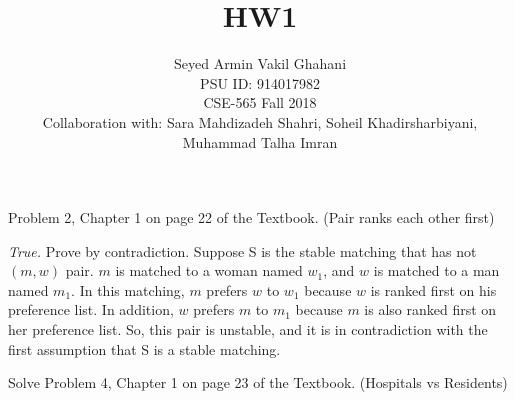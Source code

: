 \documentclass[12pt]{article}
\newenvironment{solution}[2][Solution]{\begin{trivlist}
\item[\hskip \labelsep {\bfseries #1}]}{\end{trivlist}}
\newenvironment{problem}[2][Problem]{\begin{trivlist}
\item[\hskip \labelsep {\bfseries #1}\hskip \labelsep {\bfseries #2.}]}{\end{trivlist}}
\begin{document}
 
\title{HW1}%
\author{Seyed Armin Vakil Ghahani\\ %
PSU ID: 914017982\\
CSE-565 Fall 2018\\
Collaboration with:
Sara Mahdizadeh Shahri, Soheil Khadirsharbiyani,\\
Muhammad Talha Imran} %
 
\maketitle
\begin{problem}{1}
Problem 2, Chapter 1 on page 22 of the Textbook. (Pair ranks each other first)
\end{problem}

\begin{solution}{}
\textit{True.} Prove by contradiction.
Suppose S is the stable matching that has not $(m,w)$ pair.
$m$ is matched to a woman named $w_1$, and $w$ is matched to a man named $m_1$.
In this matching, $m$ prefers $w$ to $w_1$ because $w$ is ranked first on his preference
list. In addition, $w$ prefers $m$ to $m_1$ because $m$ is also ranked first on her 
preference list. So, this pair is unstable, and it is in contradiction with the
first assumption that S is a stable matching.
\end{solution}



\begin{problem}{2}
Solve Problem 4, Chapter 1 on page 23 of the Textbook. (Hospitals vs Residents)
\end{problem}
\end{document}
